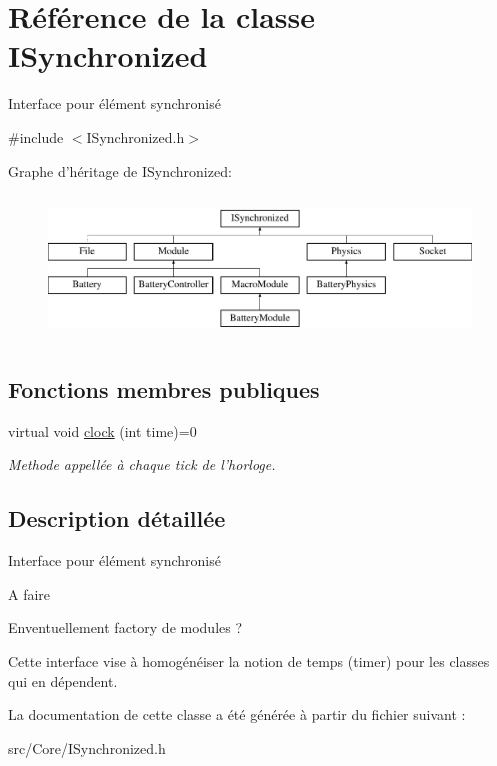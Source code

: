 \hypertarget{classISynchronized}{\section{Référence de la classe I\-Synchronized}
\label{classISynchronized}
}


Interface pour élément synchronisé  




{\ttfamily \#include $<$I\-Synchronized.\-h$>$}

Graphe d'héritage de I\-Synchronized\-:\begin{figure}[H]
\begin{center}
\leavevmode
\includegraphics[height=3.862069cm]{classISynchronized}
\end{center}
\end{figure}
\subsection*{Fonctions membres publiques}
\begin{DoxyCompactItemize}
\item 
\hypertarget{classISynchronized_af7155c662758d6c70f381bb9b11afcd6}{virtual void \hyperlink{classISynchronized_af7155c662758d6c70f381bb9b11afcd6}{clock} (int time)=0}\label{classISynchronized_af7155c662758d6c70f381bb9b11afcd6}

\begin{DoxyCompactList}\small\item\em Methode appellée à chaque tick de l'horloge. \end{DoxyCompactList}\end{DoxyCompactItemize}


\subsection{Description détaillée}
Interface pour élément synchronisé 

\begin{DoxyRefDesc}{A faire}
\item[\hyperlink{todo__todo000006}{A faire}]Enventuellement factory de modules ? \end{DoxyRefDesc}


Cette interface vise à homogénéiser la notion de temps (timer) pour les classes qui en dépendent. 

La documentation de cette classe a été générée à partir du fichier suivant \-:\begin{DoxyCompactItemize}
\item 
src/\-Core/I\-Synchronized.\-h\end{DoxyCompactItemize}
